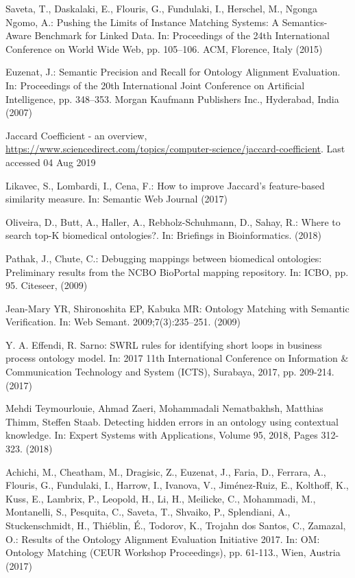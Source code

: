 \documentclass[runningheads]{llncs}
\begin{document}
\begin{thebibliography}{8}
Saveta, T., Daskalaki, E., Flouris, G., Fundulaki, I., Herschel, M., Ngonga Ngomo, A.: Pushing the Limits of Instance Matching Systems: A Semantics-Aware Benchmark for Linked Data. In: Proceedings of the 24th International Conference on World Wide Web, pp. 105--106. ACM, Florence, Italy (2015)

Euzenat, J.: Semantic Precision and Recall for Ontology Alignment Evaluation. In: Proceedings of the 20th International Joint Conference on Artificial Intelligence, pp. 348--353. Morgan Kaufmann Publishers Inc., Hyderabad, India (2007)

Jaccard Coefficient - an overview, \url{https://www.sciencedirect.com/topics/computer-science/jaccard-coefficient}. Last accessed 04 Aug 2019

Likavec, S., Lombardi, I., Cena, F.: How to improve Jaccard’s feature-based similarity measure. In: Semantic Web Journal (2017)

Oliveira, D., Butt, A., Haller, A., Rebholz-Schuhmann, D., Sahay, R.: Where to search top-K biomedical ontologies?. In: Briefings in Bioinformatics. (2018)

Pathak, J., Chute, C.: Debugging mappings between biomedical ontologies: Preliminary results from the NCBO BioPortal mapping repository. In: ICBO, pp. 95. Citeseer, (2009)

Jean-Mary YR, Shironoshita EP, Kabuka MR: Ontology Matching with Semantic Verification. In: Web Semant. 2009;7(3):235–251. (2009)

Y. A. Effendi, R. Sarno: SWRL rules for identifying short loops in business process ontology model. In: 2017 11th International Conference on Information \& Communication Technology and System (ICTS), Surabaya, 2017, pp. 209-214. (2017)

Mehdi Teymourlouie, Ahmad Zaeri, Mohammadali Nematbakhsh, Matthias Thimm, Steffen Staab. Detecting hidden errors in an ontology using contextual knowledge. In: Expert Systems with Applications, Volume 95, 2018, Pages 312-323. (2018)


Achichi, M., Cheatham, M., Dragisic, Z., Euzenat, J., Faria, D., Ferrara, A., Flouris, G., Fundulaki, I., Harrow, I., Ivanova, V., Jim{\'e}nez-Ruiz, E., Kolthoff, K., Kuss, E., Lambrix, P., Leopold, H., Li, H., Meilicke, C., Mohammadi, M., Montanelli, S., Pesquita, C., Saveta, T., Shvaiko, P., Splendiani, A., Stuckenschmidt, H., Thi{\'e}blin, {\'E}., Todorov, K., Trojahn dos Santos, C., Zamazal, O.: Results of the Ontology Alignment Evaluation Initiative 2017. In:  OM: Ontology Matching (CEUR Workshop Proceedings), pp. 61-113., Wien, Austria (2017)


\end{thebibliography}
\end{document}
